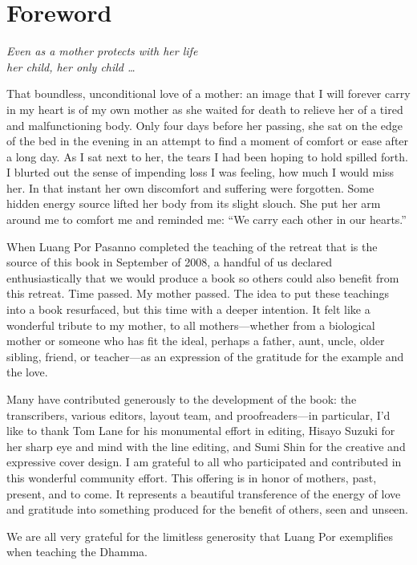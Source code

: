 \chapter{Foreword}

{\center
\emph{Even as a mother protects with her life\\her child, her only child
\ldots{}}

}

\vspace{1em}\noindent
That boundless, unconditional love of a mother: an image that I will
forever carry in my heart is of my own mother as she waited for death to
relieve her of a tired and malfunctioning body. Only four days before
her passing, she sat on the edge of the bed in the evening in an attempt
to find a moment of comfort or ease after a long day. As I sat next to
her, the tears I had been hoping to hold spilled forth. I blurted out
the sense of impending loss I was feeling, how much I would miss her. In
that instant her own discomfort and suffering were forgotten. Some
hidden energy source lifted her body from its slight slouch. She put her
arm around me to comfort me and reminded me: “We carry each other in our
hearts.”

When Luang Por Pasanno completed the teaching of the retreat that is the
source of this book in September of 2008, a handful of us declared
enthusiastically that we would produce a book so others could also
benefit from this retreat. Time passed. My mother passed. The idea to
put these teachings into a book resurfaced, but this time with a deeper
intention. It felt like a wonderful tribute to my mother, to all
mothers—whether from a biological mother or someone who has fit the
ideal, perhaps a father, aunt, uncle, older sibling, friend, or
teacher—as an expression of the gratitude for the example and the love.

Many have contributed generously to the development of the book: the
transcribers, various editors, layout team, and proofreaders—in
particular, I'd like to thank Tom Lane for his monumental effort in
editing, Hisayo Suzuki for her sharp eye and mind with the line editing,
and Sumi Shin for the creative and expressive cover design. I am
grateful to all who participated and contributed in this wonderful
community effort. This offering is in honor of mothers, past, present,
and to come. It represents a beautiful transference of the energy of
love and gratitude into something produced for the benefit of others,
seen and unseen.

We are all very grateful for the limitless generosity that Luang Por
exemplifies when teaching the Dhamma.
